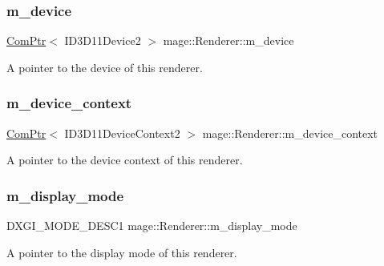 \subsubsection{\texorpdfstring{m\+\_\+device}{m\_device}}
{\footnotesize\ttfamily \hyperlink{namespacemage_ae74f374780900893caa5555d1031fd79}{Com\+Ptr}$<$ I\+D3\+D11\+Device2 $>$ mage\+::\+Renderer\+::m\+\_\+device\hspace{0.3cm}{\ttfamily [private]}}

A pointer to the device of this renderer. \hypertarget{classmage_1_1_renderer_a47c4a1d46e84bbdc3ec876809633877e}{}\label{classmage_1_1_renderer_a47c4a1d46e84bbdc3ec876809633877e} 
\subsubsection{\texorpdfstring{m\+\_\+device\+\_\+context}{m\_device\_context}}
{\footnotesize\ttfamily \hyperlink{namespacemage_ae74f374780900893caa5555d1031fd79}{Com\+Ptr}$<$ I\+D3\+D11\+Device\+Context2 $>$ mage\+::\+Renderer\+::m\+\_\+device\+\_\+context\hspace{0.3cm}{\ttfamily [private]}}

A pointer to the device context of this renderer. \hypertarget{classmage_1_1_renderer_af7ba5455da0dfa1f68ceeb49d43cf6f0}{}\label{classmage_1_1_renderer_af7ba5455da0dfa1f68ceeb49d43cf6f0} 
\subsubsection{\texorpdfstring{m\+\_\+display\+\_\+mode}{m\_display\_mode}}
{\footnotesize\ttfamily D\+X\+G\+I\+\_\+\+M\+O\+D\+E\+\_\+\+D\+E\+S\+C1 mage\+::\+Renderer\+::m\+\_\+display\+\_\+mode\hspace{0.3cm}{\ttfamily [private]}}

A pointer to the display mode of this renderer. \hypertarget{classmage_1_1_renderer_a27a62437e26957890563a68ebcde1909}{}\label{classmage_1_1_renderer_a27a62437e26957890563a68ebcde1909} 
